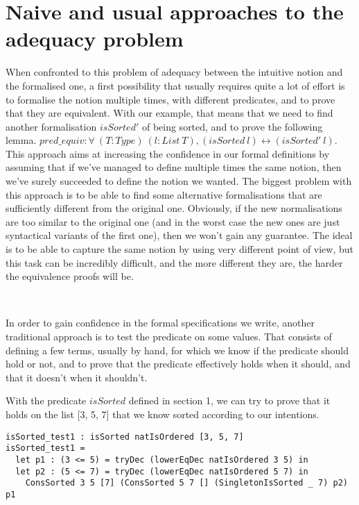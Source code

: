 \section{Naive and usual approaches to the adequacy problem}

\label{sect:naiveApproaches}


When confronted to this problem of adequacy between the intuitive notion and the formalised one, a first possibility that usually requires quite a lot of effort is to formalise the notion multiple times, with different predicates, and to prove that they are equivalent.
With our example, that means that we need to find another formalisation $isSorted'$ of being sorted, and to prove the following lemma.
$pred\_equiv : \forall\ (T:Type)\ (l:List\ T), (isSorted\ l) \leftrightarrow (isSorted'\ l)$.
This approach aims at increasing the confidence in our formal definitions by assuming that if we've managed to define multiple times the same notion, then we've surely succeeded to define the notion we wanted. The biggest problem with this approach is to be able to find some alternative formalisations that are sufficiently different from the original one. Obviously, if the new normalisations are too similar to the original one (and in the worst case the new ones are just syntactical variants of the first one), then we won't gain any guarantee. The ideal is to be able to capture the same notion by using very different point of view, but this task can be incredibly difficult, and the more different they are, the harder the equivalence proofs will be.

\

In order to gain confidence in the formal specifications we write, another traditional approach is to test the predicate on some values. That consists of defining a few terms, usually by hand, for which we know if the predicate should hold or not, and to prove that the predicate effectively holds when it should, and that it doesn't when it shouldn't.

With the predicate $isSorted$ defined in section 1, we can try to prove that it holds on the list [3, 5, 7] that we know sorted according to our intentions.

\begin{lstlisting}
isSorted_test1 : isSorted natIsOrdered [3, 5, 7]
isSorted_test1 = 
  let p1 : (3 <= 5) = tryDec (lowerEqDec natIsOrdered 3 5) in
  let p2 : (5 <= 7) = tryDec (lowerEqDec natIsOrdered 5 7) in
    ConsSorted 3 5 [7] (ConsSorted 5 7 [] (SingletonIsSorted _ 7) p2) p1
\end{lstlisting}

